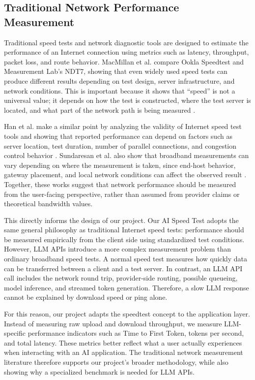 \documentclass[11pt, a4paper]{article}
\begin{document}
\subsection{Traditional Network Performance Measurement}

Traditional speed tests and network diagnostic tools are designed to estimate the performance of an Internet connection using metrics such as latency, throughput, packet loss, and route behavior. MacMillan et al. compare Ookla Speedtest and Measurement Lab's NDT7, showing that even widely used speed tests can produce different results depending on test design, server infrastructure, and network conditions. This is important because it shows that ``speed'' is not a universal value; it depends on how the test is constructed, where the test server is located, and what part of the network path is being measured \cite{speedtestndt7}.

Han et al. make a similar point by analyzing the validity of Internet speed test tools and showing that reported performance can depend on factors such as server location, test duration, number of parallel connections, and congestion control behavior \cite{speedtestvalidity}. Sundaresan et al. also show that broadband measurements can vary depending on where the measurement is taken, since end-host behavior, gateway placement, and local network conditions can affect the observed result \cite{broadbandgateway}. Together, these works suggest that network performance should be measured from the user-facing perspective, rather than assumed from provider claims or theoretical bandwidth values.

This directly informs the design of our project. Our AI Speed Test adopts the same general philosophy as traditional Internet speed tests: performance should be measured empirically from the client side using standardized test conditions. However, LLM APIs introduce a more complex measurement problem than ordinary broadband speed tests. A normal speed test measures how quickly data can be transferred between a client and a test server. In contrast, an LLM API call includes the network round trip, provider-side routing, possible queueing, model inference, and streamed token generation. Therefore, a slow LLM response cannot be explained by download speed or ping alone.

For this reason, our project adapts the speedtest concept to the application layer. Instead of measuring raw upload and download throughput, we measure LLM-specific performance indicators such as Time to First Token, tokens per second, and total latency. These metrics better reflect what a user actually experiences when interacting with an AI application. The traditional network measurement literature therefore supports our project's broader methodology, while also showing why a specialized benchmark is needed for LLM APIs.
\end{document}
